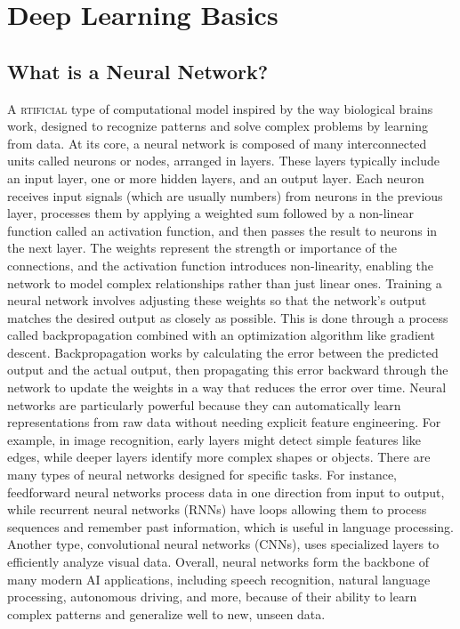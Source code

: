 \documentclass{book}
\begin{document}
\chapter{Deep Learning Basics}

\section{What is a Neural Network?}
\lettrine{A}{ rtificial} type of computational model inspired by the way biological brains work, designed to recognize patterns and solve complex problems by learning from data. At its core, a neural network is composed of many interconnected units called neurons or nodes, arranged in layers. These layers typically include an input layer, one or more hidden layers, and an output layer.
Each neuron receives input signals (which are usually numbers) from neurons in the previous layer, processes them by applying a weighted sum followed by a non-linear function called an activation function, and then passes the result to neurons in the next layer. The weights represent the strength or importance of the connections, and the activation function introduces non-linearity, enabling the network to model complex relationships rather than just linear ones.
Training a neural network involves adjusting these weights so that the network’s output matches the desired output as closely as possible. This is done through a process called backpropagation combined with an optimization algorithm like gradient descent. Backpropagation works by calculating the error between the predicted output and the actual output, then propagating this error backward through the network to update the weights in a way that reduces the error over time.
Neural networks are particularly powerful because they can automatically learn representations from raw data without needing explicit feature engineering. For example, in image recognition, early layers might detect simple features like edges, while deeper layers identify more complex shapes or objects.
There are many types of neural networks designed for specific tasks. For instance, feedforward neural networks process data in one direction from input to output, while recurrent neural networks (RNNs) have loops allowing them to process sequences and remember past information, which is useful in language processing. Another type, convolutional neural networks (CNNs), uses specialized layers to efficiently analyze visual data.
Overall, neural networks form the backbone of many modern AI applications, including speech recognition, natural language processing, autonomous driving, and more, because of their ability to learn complex patterns and generalize well to new, unseen data.
\end{document}
